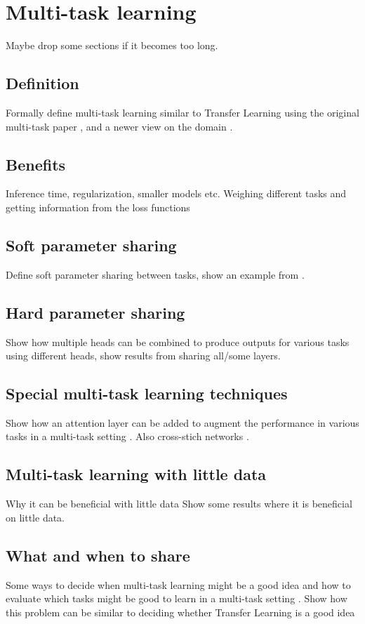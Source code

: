 \chapter{Multi-task learning}
Maybe drop some sections if it becomes too long.
\section{Definition}
Formally define multi-task learning similar to Transfer Learning using the original multi-task paper \citep{origMultitask}, and a newer view on the domain \citep{surveyOnMultiTask}.
\section{Benefits}
Inference time, regularization, smaller models etc. Weighing different tasks and getting information from the loss functions \citep{lossWeighting} \citep{usingUncertaintyToWeighLosses}
\section{Soft parameter sharing}
Define soft parameter sharing between tasks, show an example from \citep{mutualLearning}.
\section{Hard parameter sharing}
Show how multiple heads can be combined to produce outputs for various tasks using different heads, show results from sharing all/some layers. \citep{visualPerson} \citep{selfDriving} \citep{healthyDrink}
\section{Special multi-task learning techniques}
Show how an attention layer can be added to augment the performance in various tasks in a multi-task setting \citep{multiTaskAttention}. Also cross-stich networks \citep{crossStitch}.
\section{Multi-task learning with little data}
Why it can be beneficial with little data \citep{surveyOnMultiTask} Show some results where it is beneficial on little data.
\section{What and when to share}
Some ways to decide when multi-task learning might be a good idea and how to evaluate which tasks might be good to learn in a multi-task setting \citep{taskonomy} \citep{whichTasks}.
Show how this problem can be similar to deciding whether Transfer Learning is a good idea \citep{whatAndWhereToTransfer} \citep{transferringMidLevelRepresentations}